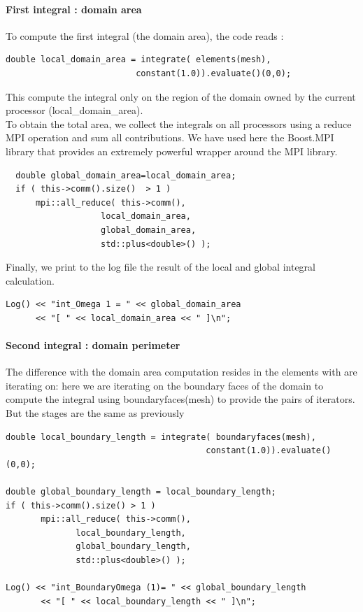 \paragraph{First integral : domain area \\}
To compute the first integral (the domain area), the code reads :
\begin{lstlisting}
double local_domain_area = integrate( elements(mesh),
                          constant(1.0)).evaluate()(0,0);
\end{lstlisting}

This compute the integral only on the region of the domain owned by the current processor (local\_domain\_area). \\

To obtain the total area, we collect the integrals on all processors using a reduce MPI operation and sum all contributions. We have used here the Boost.MPI library that provides an extremely powerful wrapper around the MPI library. \\
\begin{lstlisting}
  double global_domain_area=local_domain_area;
  if ( this->comm().size()  > 1 )
      mpi::all_reduce( this->comm(),
                   local_domain_area,
                   global_domain_area,
                   std::plus<double>() );
\end{lstlisting}

\vspace{0.2cm}
Finally, we print to the log file the result of the local and global integral calculation.
\begin{lstlisting}
Log() << "int_Omega 1 = " << global_domain_area
      << "[ " << local_domain_area << " ]\n";
\end{lstlisting}


\paragraph{Second integral : domain perimeter \\}

The difference with the domain area computation resides in the elements with are iterating on: here we are iterating on the boundary faces of the domain to compute the integral using boundaryfaces(mesh) to provide the pairs of iterators. But the stages are the same as previously \\
\begin{lstlisting}
double local_boundary_length = integrate( boundaryfaces(mesh),
                                        constant(1.0)).evaluate()(0,0);

double global_boundary_length = local_boundary_length;
if ( this->comm().size() > 1 )
       mpi::all_reduce( this->comm(),
              local_boundary_length,
              global_boundary_length,
              std::plus<double>() );

Log() << "int_BoundaryOmega (1)= " << global_boundary_length
       << "[ " << local_boundary_length << " ]\n";
\end{lstlisting}

